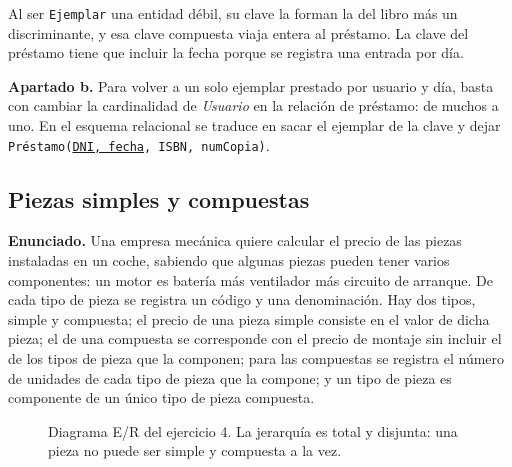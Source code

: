 Al ser \texttt{Ejemplar} una entidad débil, su clave la forman la del libro más
un discriminante, y esa clave compuesta viaja entera al préstamo. La clave del
préstamo tiene que incluir la fecha porque se registra una entrada por día.

\textbf{Apartado b.} Para volver a un solo ejemplar prestado por usuario y día,
basta con cambiar la cardinalidad de \emph{Usuario} en la relación de préstamo:
de muchos a uno. En el esquema relacional se traduce en sacar el ejemplar de la
clave y dejar \texttt{Préstamo(\underline{DNI, fecha}, ISBN, numCopia)}.

\subsection{Piezas simples y compuestas}

\textbf{Enunciado.} Una empresa mecánica quiere calcular el precio de las piezas
instaladas en un coche, sabiendo que algunas piezas pueden tener varios
componentes: un motor es batería más ventilador más circuito de arranque. De cada
tipo de pieza se registra un código y una denominación. Hay dos tipos, simple y
compuesta; el precio de una pieza simple consiste en el valor de dicha pieza; el
de una compuesta se corresponde con el precio de montaje sin incluir el de los
tipos de pieza que la componen; para las compuestas se registra el número de
unidades de cada tipo de pieza que la compone; y un tipo de pieza es componente
de un único tipo de pieza compuesta.

\begin{figure}[H]
\centering
{}
\caption{Diagrama E/R del ejercicio 4. La jerarquía es total y disjunta: una
pieza no puede ser simple y compuesta a la vez.}
\end{figure}

